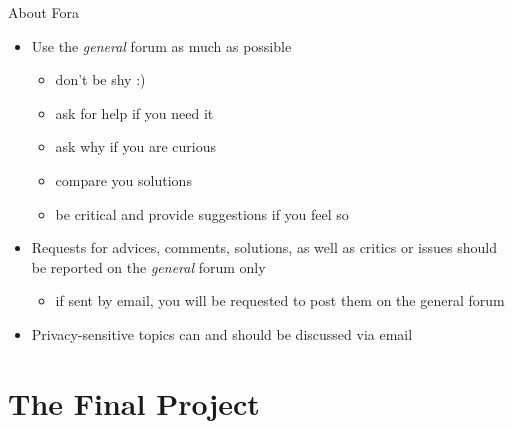\documentclass[presentation]{beamer}\mode<presentation>{\usetheme{AMSBolognaFC}}
\begin{document}
\begin{frame}[c]{About Fora}
    \begin{itemize}
		\item Use the \emph{general} forum as much as possible
		\\
		\uurl{\generalForum}
		\begin{itemize}
			\item don't be shy :)
			\item ask for help if you need it
			\item ask why if you are curious
			\item compare you solutions
			\item be critical and provide suggestions if you feel so
		\end{itemize}

		\bigskip

		\item Requests for advices, comments, solutions, as well as critics or issues should be reported on the \emph{general} forum \alert{only}
		\begin{itemize}
			\item if sent by email, you will be requested to post them on the general forum
		\end{itemize}

		\bigskip

		\item Privacy-sensitive topics can and should be discussed via email
	\end{itemize}
\end{frame}

\section{The Final Project}
\end{document}

